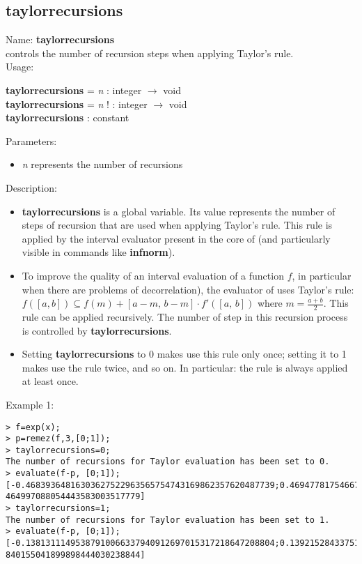 \subsection{taylorrecursions}
\label{labtaylorrecursions}
\noindent Name: \textbf{taylorrecursions}\\
controls the number of recursion steps when applying Taylor's rule.\\
\noindent Usage: 
\begin{center}
\textbf{taylorrecursions} = \emph{n} : \textsf{integer} $\rightarrow$ \textsf{void}\\
\textbf{taylorrecursions} = \emph{n} ! : \textsf{integer} $\rightarrow$ \textsf{void}\\
\textbf{taylorrecursions} : \textsf{constant}\\
\end{center}
Parameters: 
\begin{itemize}
\item \emph{n} represents the number of recursions
\end{itemize}
\noindent Description: \begin{itemize}

\item \textbf{taylorrecursions} is a global variable. Its value represents the number of steps
   of recursion that are used when applying Taylor's rule. This rule is applied
   by the interval evaluator present in the core of \sollya (and particularly
   visible in commands like \textbf{infnorm}).

\item To improve the quality of an interval evaluation of a function $f$, in 
   particular when there are problems of decorrelation), the evaluator of \sollya
   uses Taylor's rule:  $f([a,b]) \subseteq f(m) + [a-m,\,b-m] \cdot f'([a,\,b])$ where $m=\frac{a+b}{2}$.
   This rule can be applied recursively.
   The number of step in this recursion process is controlled by \textbf{taylorrecursions}.

\item Setting \textbf{taylorrecursions} to 0 makes \sollya use this rule only once;
   setting it to 1 makes \sollya use the rule twice, and so on.
   In particular: the rule is always applied at least once.
\end{itemize}
\noindent Example 1: 
\begin{center}\begin{minipage}{15cm}\begin{Verbatim}[frame=single]
> f=exp(x);
> p=remez(f,3,[0;1]);
> taylorrecursions=0;
The number of recursions for Taylor evaluation has been set to 0.
> evaluate(f-p, [0;1]);
[-0.46839364816303627522963565754743169862357620487739;0.46947781754667086491682
464997088054443583003517779]
> taylorrecursions=1;
The number of recursions for Taylor evaluation has been set to 1.
> evaluate(f-p, [0;1]);
[-0.13813111495387910066337940912697015317218647208804;0.13921528433751369035056
840155041899898444030238844]
\end{Verbatim}
\end{minipage}\end{center}
